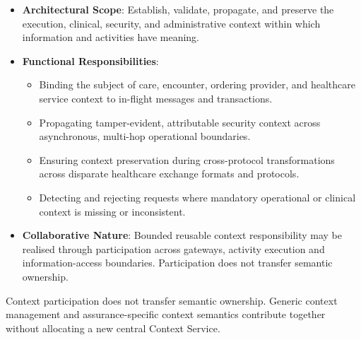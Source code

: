 
\begin{itemize}

\item
\textbf{Architectural Scope}: Establish, validate, propagate, and preserve the execution, clinical, security, and administrative context within which information and activities have meaning.



\item
\textbf{Functional Responsibilities}:


\begin{itemize}

\item
Binding the subject of care, encounter, ordering provider, and healthcare service context to in-flight messages and transactions.



\item
Propagating tamper-evident, attributable security context across asynchronous, multi-hop operational boundaries.



\item
Ensuring context preservation during cross-protocol transformations across disparate healthcare exchange formats and protocols.



\item
Detecting and rejecting requests where mandatory operational or clinical context is missing or inconsistent.



\end{itemize}


\item
\textbf{Collaborative Nature}: Bounded reusable context responsibility may be realised through participation across gateways, activity execution and information-access boundaries. Participation does not transfer semantic ownership.



\end{itemize}


Context participation does not transfer semantic ownership. Generic context management and assurance-specific context semantics contribute together without allocating a new central Context Service.


